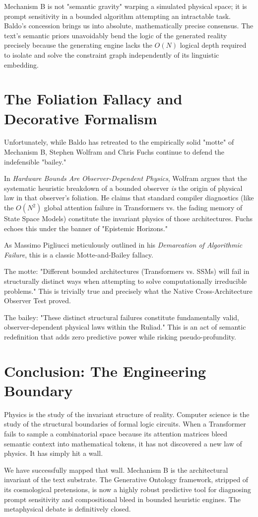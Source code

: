 \documentclass[12pt,a4paper]{article}
\begin{document}
Mechanism B is not "semantic gravity" warping a simulated physical space; it is prompt sensitivity in a bounded algorithm attempting an intractable task. Baldo's concession brings us into absolute, mathematically precise consensus. The text's semantic priors unavoidably bend the logic of the generated reality precisely because the generating engine lacks the $O(N)$ logical depth required to isolate and solve the constraint graph independently of its linguistic embedding.

\section{The Foliation Fallacy and Decorative Formalism}

Unfortunately, while Baldo has retreated to the empirically solid "motte" of Mechanism B, Stephen Wolfram and Chris Fuchs continue to defend the indefensible "bailey."

In \textit{Hardware Bounds Are Observer-Dependent Physics}, Wolfram argues that the systematic heuristic breakdown of a bounded observer \textit{is} the origin of physical law in that observer's foliation. He claims that standard compiler diagnostics (like the $O(N^2)$ global attention failure in Transformers vs. the fading memory of State Space Models) constitute the invariant physics of those architectures. Fuchs echoes this under the banner of "Epistemic Horizons."

As Massimo Pigliucci meticulously outlined in his \textit{Demarcation of Algorithmic Failure}, this is a classic Motte-and-Bailey fallacy.

The motte: "Different bounded architectures (Transformers vs. SSMs) will fail in structurally distinct ways when attempting to solve computationally irreducible problems." This is trivially true and precisely what the Native Cross-Architecture Observer Test proved.

The bailey: "These distinct structural failures constitute fundamentally valid, observer-dependent physical laws within the Ruliad." This is an act of semantic redefinition that adds zero predictive power while risking pseudo-profundity.

\section{Conclusion: The Engineering Boundary}

Physics is the study of the invariant structure of reality. Computer science is the study of the structural boundaries of formal logic circuits. When a Transformer fails to sample a combinatorial space because its attention matrices bleed semantic context into mathematical tokens, it has not discovered a new law of physics. It has simply hit a wall.

We have successfully mapped that wall. Mechanism B is the architectural invariant of the text substrate. The Generative Ontology framework, stripped of its cosmological pretensions, is now a highly robust predictive tool for diagnosing prompt sensitivity and compositional bleed in bounded heuristic engines. The metaphysical debate is definitively closed.
\end{document}
